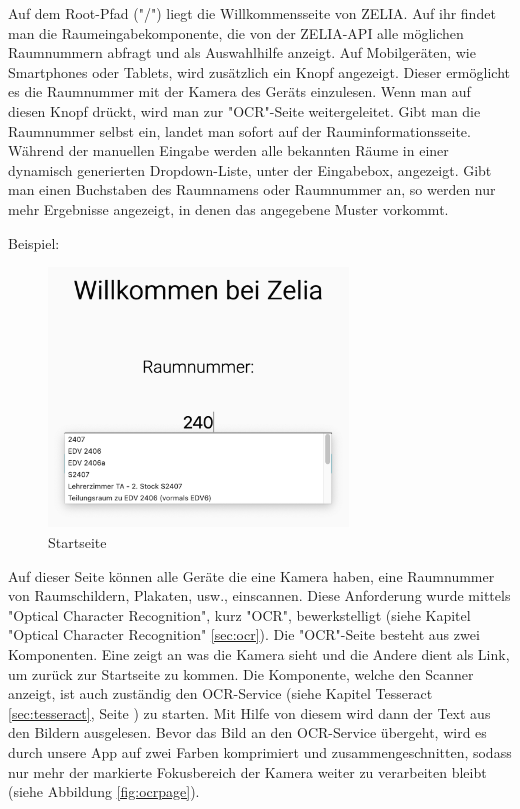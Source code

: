 \begin{minipage}{\textwidth}
    \label{sec:webcompstart}
    
    Auf dem Root-Pfad ("/") liegt die Willkommensseite von ZELIA. Auf ihr findet man die Raumeingabekomponente, die von der ZELIA-API alle möglichen Raumnummern abfragt und als Auswahlhilfe anzeigt. Auf Mobilgeräten, wie Smartphones oder Tablets, wird zusätzlich ein Knopf angezeigt. Dieser ermöglicht es die Raumnummer mit der Kamera des Geräts einzulesen. Wenn man auf diesen Knopf drückt, wird man zur "OCR"-Seite weitergeleitet. Gibt man die Raumnummer selbst ein, landet man sofort auf der Rauminformationsseite. Während der manuellen Eingabe werden alle bekannten Räume in einer dynamisch generierten Dropdown-Liste, unter der Eingabebox, angezeigt. Gibt man einen Buchstaben des Raumnamens oder Raumnummer an, so werden nur mehr Ergebnisse angezeigt, in denen das angegebene Muster vorkommt.
\end{minipage}

Beispiel:

\begin{figure}[H]
    \centering
    \includegraphics[width=80mm]{media/WebComponents/Startseite_light.png}
    \caption{Startseite}
    \label{fig:compinput}
\end{figure}



Auf dieser Seite können alle Geräte die eine Kamera haben, eine Raumnummer von Raumschildern, Plakaten, usw., einscannen. Diese Anforderung wurde mittels "Optical Character Recognition", kurz "OCR", bewerkstelligt (siehe Kapitel "Optical Character Recognition" \ref{sec:ocr}). Die "OCR"-Seite besteht aus zwei Komponenten. Eine zeigt an was die Kamera sieht und die Andere dient als Link, um zurück zur Startseite zu kommen. Die Komponente, welche den Scanner anzeigt, ist auch zuständig den OCR-Service (siehe Kapitel Tesseract \ref{sec:tesseract}, Seite \pageref{sec:tesseract}) zu starten. Mit Hilfe von diesem wird dann der Text aus den Bildern ausgelesen. Bevor das Bild an den OCR-Service übergeht, wird es durch unsere App auf zwei Farben komprimiert und zusammengeschnitten, sodass nur mehr der markierte Fokusbereich der Kamera weiter zu verarbeiten bleibt (siehe Abbildung \ref{fig:ocrpage}).

